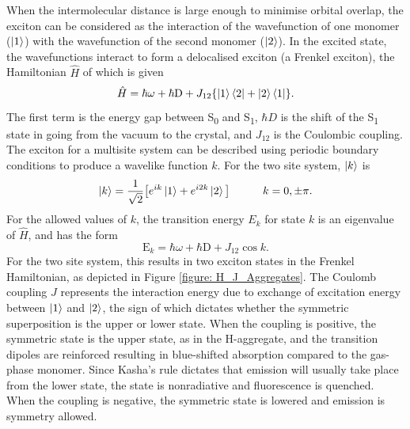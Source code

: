 When the intermolecular distance is large enough to minimise orbital overlap, the exciton can be considered as the interaction of the wavefunction of one monomer ($\ket{1}$) with the wavefunction of the second monomer ($\ket{2}$). In the excited state, the wavefunctions interact to form a delocalised exciton (a Frenkel exciton), the Hamiltonian $\hat{H}$ of which is given
\begin{equation}
\hat{H}=\hbar\omega + \mathrm{\hbar{}D} + J_{12}\{\ket{1}\bra{2}+\ket{2}\bra{1}\}.
\end{equation}
The first term is the energy gap between S\textsubscript{0} and S\textsubscript{1},  $\hbar{}D$ is the shift of the S\textsubscript{1} state in going from the vacuum to the crystal, and $J_{12}$ is the Coulombic coupling.\cite{Spano} The exciton for a multisite system can be described using periodic boundary conditions to produce a wavelike function $k$. For the two site system, $\ket{k}$ is\cite{Hestand2018}
\begin{equation}
\ket{k}=\frac{1}{\sqrt{2}}\big[e^{ik}\ket{1}+  e^{i2k}\ket{2}\big]\qquad\quad k=0,\pm{\pi}.
\end{equation}
For the allowed values of $k$, the transition energy $E_k$ for state $k$ is an eigenvalue of $\hat{H}$, and has the form
\begin{equation}
\mathrm{E}_{k}=\hbar\omega + \mathrm{\hbar{}D} +J_{12}\cos{k}.
\end{equation}
For the two site system, this results in two exciton states in the Frenkel Hamiltonian, as depicted in Figure \ref{figure: H_J_Aggregates}. The Coulomb coupling $J$ represents the interaction energy due to exchange of excitation energy between $\ket{1}$ and $\ket{2}$, the sign of which dictates whether the symmetric superposition is the upper or lower state. When the coupling is positive, the symmetric state is the upper state, as in the H-aggregate, and the transition dipoles are reinforced resulting in blue-shifted absorption compared to the gas-phase monomer. Since Kasha's rule dictates that emission will usually take place from the lower state, the state is nonradiative and fluorescence is quenched.\cite{Kasha1950} When the coupling is negative, the symmetric state is lowered and emission is symmetry allowed.\cite{Hestand2017}
